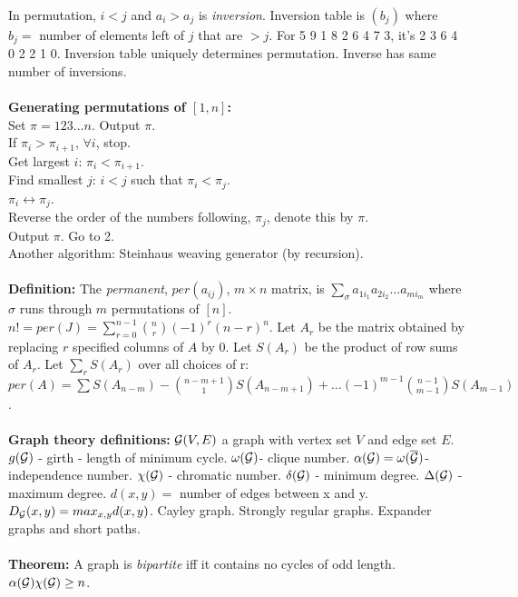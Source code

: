 In permutation, $i<j$ and $a_i > a_j$ is \emph{inversion}.  Inversion table is
$( b_j )$ where $b_j =$ number of elements left of $j$ that are $>j$.
For 5 9 1 8 2 6 4 7 3, it's 2 3 6 4 0 2 2 1 0.  Inversion table uniquely
determines permutation.  Inverse has same number of inversions.
\\
\\
{\bf Generating permutations of $[1,n]$:}\\
\jt Set $\pi = 123 \ldots n$.  Output $\pi$.\\
\jt If $\pi_i > \pi_{i+1}$, $\forall i$, stop.\\
\jt Get largest $i$: $\pi_i < \pi_{i+1}$.\\
\jt Find smallest $j$: $i<j$ such that $\pi_i < \pi_j$.\\
\jt $\pi_i \leftrightarrow \pi_j$.\\
\jt Reverse the order of the numbers following, $\pi_j$, denote this
by $\pi$.\\
\jt Output $\pi$.  Go to 2.\\
Another algorithm: Steinhaus weaving generator (by recursion).
\\
\\
{\bf Definition:}  
The \emph{permanent}, $per( a_{ij} )$, $m \times n$ matrix, is
$\sum_{\sigma} a_{1 i_1} a_{2 i_2} \ldots a_{m i_m}$ where
$\sigma$ runs through $m$ permutations of $[n]$.
$ n!= per(J) = \sum_{r=0}^{n-1} {n \choose r} (-1)^{r} (n-r)^{n}$.
Let $A_r$ be the matrix obtained by replacing $r$ specified
columns of $A$ by $0$.  Let $S(A_r )$ be the product of row sums of
$A_r$.  Let $\sum_r S(A_r )$ over all choices of r:
$ per(A)= \sum S(A_{n-m}) - {n-m+1 \choose 1} S(A_{n-m+1}) +
\ldots (-1)^{m-1} {n-1 \choose m-1} S(A_{m-1}) $.  \\
\\
{\bf Graph theory definitions:}  
${\cal G}(V,E)$ a graph with vertex set $V$ and edge set $E$.
$g({\cal G})$ - girth - length of minimum cycle.
$\omega ({\cal G})$- clique number.
$\alpha ({\cal G})= \omega (\overline {{\cal G}})$- independence number.
$\chi ({\cal G})$ - chromatic number.
$\delta({\cal G})$ - minimum degree.
$\Delta ({\cal G})$ - maximum degree.
$d (x,y)= $ number of edges between x and y.
$D_{\cal G} (x,y)= max_{x, y} d(x, y)$.
Cayley graph.  Strongly regular graphs. Expander graphs and short paths.
\\
\\
{\bf Theorem:}
A graph is \emph{bipartite} iff it contains no cycles of odd length.
$\alpha ({\cal G}) \chi ({\cal G}) \geq n$.
